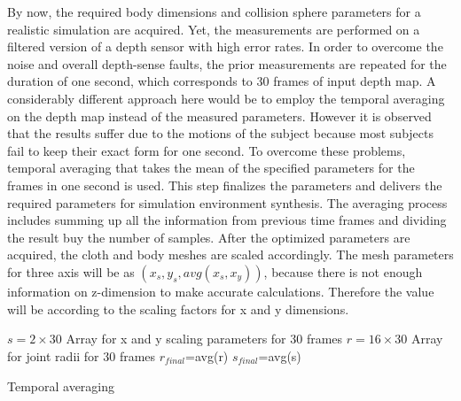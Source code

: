 By now, the required body dimensions and collision sphere parameters for a realistic simulation are acquired. Yet, the measurements are performed on a filtered version of a depth sensor with high error rates. In order to overcome the noise and overall depth-sense faults,
 the prior measurements are repeated for the duration of one second, which corresponds to 30 frames of input depth map. A considerably different approach here would be to employ the temporal averaging on the depth map instead of the measured parameters. However it is observed that the results suffer due to the motions of the subject because most subjects fail to keep their exact form for one second. 
To overcome these problems, temporal averaging that takes the mean of the specified parameters for the frames in one second is used. 
This step finalizes the parameters and delivers the required parameters for simulation environment synthesis. The averaging process includes summing up all the information from previous time frames and dividing the result buy the number of samples. After the optimized parameters are acquired, the cloth and body meshes are scaled accordingly. The mesh parameters for three axis will be as $(x_s, y_s, avg(x_s, x_y))$, because there is not enough information on z-dimension to make accurate calculations. Therefore the value will be
 according to the scaling factors for x and y dimensions.

\begin{algorithm}[ht]
\DontPrintSemicolon %
$s=2 \times 30 $ Array for x and y scaling parameters for 30 frames\;
$r=16 \times 30 $ Array for joint radii for 30 frames\;
$r_\textit{final}$=avg(r)\;
$s_\textit{final}$=avg(s)\;
\caption{Temporal averaging}
\label{algo:temporal_averaging}
\end{algorithm}
